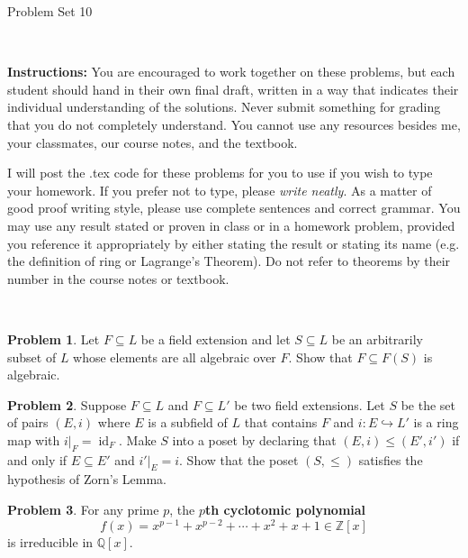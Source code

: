 \documentclass[11pt]{article}
\title{}
\date{\vspace{-0.5in}}
\DeclareMathOperator{\id}{id}
\newcommand{\Q}{\mathbb{Q}}
\newcommand{\Z}{\mathbb{Z}}
\theoremstyle{definition}
\newtheorem{problem}{Problem}
\begin{document}
\thispagestyle{fancy}
\pagestyle{fancy}

\vspace{3em}

\begin{center}
	{\LARGE Problem Set 10}
\end{center}

\

\noindent
{\bf Instructions:}
You are encouraged to work together on these problems, but each student should hand in their own final draft, written in a way that indicates their individual understanding of the solutions. Never submit something for grading that you do not completely understand. You cannot use any resources besides me, your classmates, our course notes, and the textbook.


I will post the .tex code for these problems for you to use if you wish to type your homework. If you prefer not to type, please  {\em write neatly}. As a matter of good proof writing style, please use complete sentences and correct grammar. You may use any result  stated or proven in class or in a homework problem, provided you reference it appropriately by either stating the result or stating its name (e.g. the definition of ring or Lagrange's Theorem). Do not refer to theorems by their number in the course notes or textbook.


\



\begin{problem}
	Let $F \subseteq L$ be a field extension and let $S \subseteq L$ be an arbitrarily subset of $L$ whose elements are all algebraic over $F$. Show that $F \subseteq F(S)$ is algebraic.
\end{problem}



\begin{problem}
Suppose $F \subseteq L$ and $F \subseteq L'$ be two field extensions. Let $S$ be the set of pairs $(E,i)$ where $E$ is a subfield of $L$ that contains $F$ and $i: E \hookrightarrow L'$ is a ring map with $i|_F = \id_F$. Make $S$ into a poset by declaring that $(E,i) \leq (E',i')$ if and only if $E \subseteq E'$ and $i'|_E = i$. Show that the poset $(S, \leq)$ satisfies the hypothesis of Zorn's Lemma.
\end{problem}



\begin{problem} 
For any prime $p$, the {\bf $p$th cyclotomic polynomial}
$$f(x) = x^{p-1} + x^{p-2} + \cdots + x^2 + x + 1 \in \Z[x]$$
is irreducible in $\Q[x]$.
\end{problem}
\end{document}
